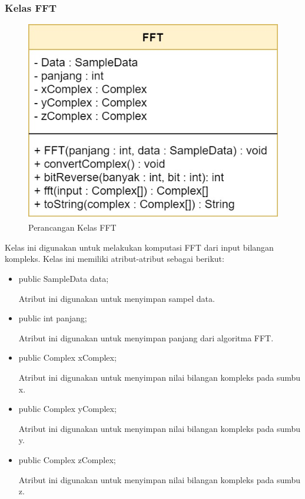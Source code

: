 \subsubsection{Kelas FFT}
\begin{figure}[H] 
	\centering  
	\includegraphics[scale=0.35]{Gambar/Controller_fft.jpg}
	\caption[Perancangan Kelas FFT]{Perancangan Kelas FFT}
	\label{fig:controller_fft} 
\end{figure}

Kelas ini digunakan untuk melakukan komputasi FFT dari input bilangan kompleks. Kelas ini memiliki atribut-atribut sebagai berikut:
\begin{itemize}
    \item public SampleData data;
    
    Atribut ini digunakan untuk menyimpan sampel data.
    
    \item public int panjang;
    
    Atribut ini digunakan untuk menyimpan panjang dari algoritma FFT.
    
    \item public Complex xComplex;
    
    Atribut ini digunakan untuk menyimpan nilai bilangan kompleks pada sumbu x.
    
    \item public Complex yComplex;
    
    Atribut ini digunakan untuk menyimpan nilai bilangan kompleks pada sumbu y.
    
    \item public Complex zComplex;
    
    Atribut ini digunakan untuk menyimpan nilai bilangan kompleks pada sumbu z.
\end{itemize}

